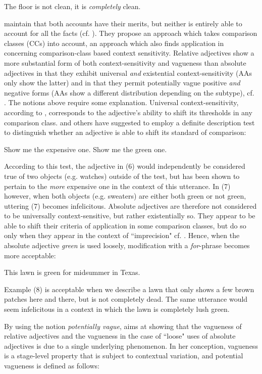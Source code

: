 \documentclass[output=paper
,modfonts
,nonflat]{langsci/langscibook}
\begin{document}
\ea
	The floor is not clean, it is \textit{completely} clean.
\z

\citet*{Toledo2011} maintain that both accounts have their merits, but neither is entirely able to account for all the facts (cf. \citealt[140]{Toledo2011}). They propose an approach which takes comparison classes (CCs) into account, an approach which also finds application in \citet{Burnett2017} concerning comparison-class based context sensitivity.
Relative adjectives show a more substantial form of both context-sensitivity and vagueness than absolute adjectives in that they exhibit universal \textit{and} existential context-sensitivity (AAs only show the latter) and in that they permit potentially vague positive \textit{and} negative forms (AAs show a different distribution depending on the subtype), cf. \citet{Burnett2017}. The notions above require some explanation. Universal context-sensitivity, according to \textcite[41]{Burnett2017}, corresponds to the adjective's ability to shift its thresholds in any comparison class. \textcite[28]{Kennedy2007} and others have suggested to employ a definite description test to distinguish whether an adjective is able to shift its standard of comparison:

\ea
	Show me the expensive one.
\z
\ea
	Show me the green one.
\z

According to this test, the adjective in (6) would independently be considered true of two objects (e.g. watches) outside of the test, but has been shown to pertain to the \textit{more} expensive one in the context of this utterance. In (7) however, when both objects (e.g. sweaters) are either both green or not green, uttering (7) becomes infelicitous. Absolute adjectives are therefore not considered to be universally context-sensitive, but rather existentially so. They appear to be able to shift their criteria of application in some comparison classes, but do so only when they appear in the context of ``imprecision" cf. \textcite[42]{Burnett2017}. Hence, when the absolute adjective \textit{green} is used loosely, modification with a \textit{for}-phrase becomes more acceptable:

\ea
	This lawn is green for midsummer in Texas.
\z

Example (8) is acceptable when we describe a lawn that only shows a few brown patches here and there, but is not completely dead. The same utterance would seem infelicitous in a context in which the lawn is completely lush green.

By using the notion \textit{potentially vague}, \textcite[49]{Burnett2017} aims at showing that the vagueness of relative adjectives and the vagueness in the case of ``loose" uses of absolute adjectives is due to a single underlying phenomenon. In her conception, vagueness is a stage-level property that is subject to contextual variation, and potential vagueness is defined as follows:
\end{document}
